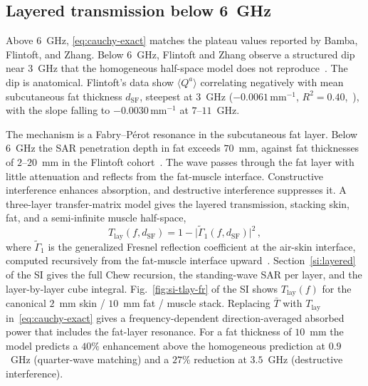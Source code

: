 \documentclass[journal,twocolumn,10pt]{IEEEtran}
\newcommand{\Tbar}{\bar{T}}
\newcommand{\Tlay}{T_{\mathrm{lay}}}
\begin{document}
\subsection{Layered transmission below 6~GHz}\label{subsec:fp}

Above $6$~GHz, \eqref{eq:cauchy-exact} matches the plateau values
reported by Bamba, Flintoft, and Zhang. Below $6$~GHz, Flintoft and
Zhang observe a structured dip near $3$~GHz that the homogeneous
half-space model does not reproduce~\cite{Flintoft2014,Zhang2017thesis}. The
dip is anatomical. Flintoft's data show $\langle Q^a\rangle$
correlating negatively with mean subcutaneous fat
thickness $d_{\mathrm{SF}}$, steepest at $3$~GHz
($-0.0061\,\mathrm{mm}^{-1}$, $R^2 = 0.40$,~\cite[Table~6]{Flintoft2014}),
with the slope falling to $-0.0030\,\mathrm{mm}^{-1}$ at $7$--$11$~GHz.

The mechanism is a Fabry--P\'erot resonance in the subcutaneous fat
layer. Below $6$~GHz the SAR penetration depth in fat exceeds
$70$~mm, against fat thicknesses of $2$--$20$~mm in the Flintoft
cohort~\cite[Table~1]{Flintoft2014}. The wave passes through the fat
layer with little attenuation and reflects from the fat-muscle
interface. Constructive interference enhances absorption, and destructive
interference suppresses it. A three-layer transfer-matrix model gives the layered transmission,
stacking skin, fat, and a semi-infinite muscle half-space,
\begin{equation}\label{eq:T-lay}
  \Tlay(f, d_{\mathrm{SF}})
  = 1 - \bigl|\widetilde{\Gamma}_1(f, d_{\mathrm{SF}})\bigr|^2\, ,
\end{equation}
where $\widetilde{\Gamma}_1$ is the generalized Fresnel reflection
coefficient at the air-skin interface, computed recursively from the
fat-muscle interface upward~\cite{Chew1995,BornWolf1999}.
Section~\ref{si:layered} of the SI gives the full Chew recursion,
the standing-wave SAR per layer, and the layer-by-layer cube
integral. Fig.~\ref{fig:si-tlay-fr} of the SI shows $\Tlay(f)$ for
the canonical $2$~mm skin / $10$~mm fat / muscle stack. Replacing
$\Tbar$ with $\Tlay$ in~\eqref{eq:cauchy-exact} gives a
frequency-dependent direction-averaged absorbed power that includes
the fat-layer resonance. For a fat thickness of $10$~mm the model
predicts a $40\%$ enhancement above the homogeneous prediction at
$0.9$~GHz (quarter-wave matching) and a $27\%$ reduction at
$3.5$~GHz (destructive interference).
\end{document}
